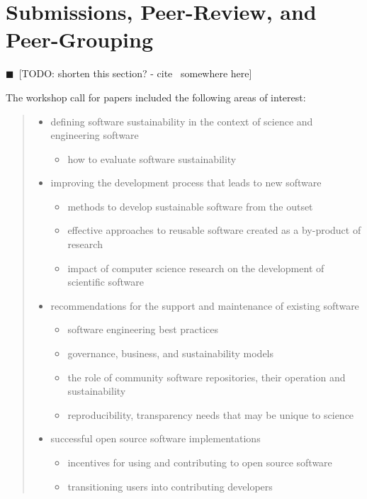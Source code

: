 \documentclass[11pt, oneside]{amsart}
\newcommand{\todo}[1]{{\color{blue}$\blacksquare$~\textsf{[TODO: #1]}}}
\begin{document}
\section{Submissions, Peer-Review, and Peer-Grouping}

\todo{shorten this section? - cite~\cite{WSSSPE2-pre-report} somewhere here}

The workshop call for papers included the following areas of interest:
\begin{quote}
\begin{itemize} 

\item defining software sustainability in the context of science and engineering
software
\begin{itemize}
\item how to evaluate software sustainability
\end{itemize}

\item improving the development process that leads to new software
\begin{itemize}
\item methods to develop sustainable software from the outset
\item effective approaches to reusable software created as a by-product of
research
\item impact of computer science research on the development of scientific
software
\end{itemize}

\item recommendations for the support and maintenance of existing software
\begin{itemize}
\item software engineering best practices
\item governance, business, and sustainability models
\item the role of community software repositories, their operation and
sustainability
\item reproducibility, transparency needs that may be unique to science
\end{itemize}

\item successful open source software implementations
\begin{itemize}
\item incentives for using and contributing to open source software
\item transitioning users into contributing developers
\end{itemize}


\end{itemize}
\end{quote}
\end{document}
